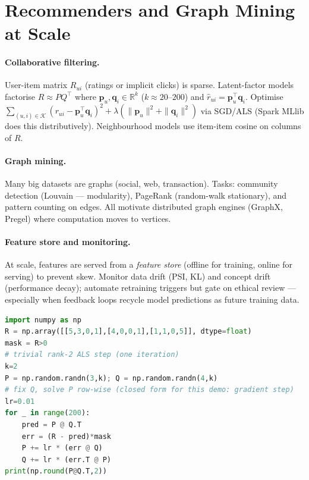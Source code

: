 \section{Recommenders and Graph Mining at Scale}
\label{sec:recommender}
\paragraph{Collaborative filtering.} User-item matrix $R_{ui}$ (ratings or implicit clicks) is sparse. Latent-factor models factorise $R\approx P Q^\top$ where $\mathbf{p}_u,\mathbf{q}_i\in\mathbb{R}^k$ ($k\approx20$--$200$) and $\hat{r}_{ui}=\mathbf{p}_u^\top\mathbf{q}_i$. Optimise $\sum_{(u,i)\in\mathcal{K}}(r_{ui}-\mathbf{p}_u^\top\mathbf{q}_i)^2+\lambda(\|\mathbf{p}_u\|^2+\|\mathbf{q}_i\|^2)$ via SGD/ALS (Spark MLlib does this distributively). Neighbourhood models use item-item cosine on columns of $R$.

\paragraph{Graph mining.} Many big datasets are graphs (social, web, transaction). Tasks: community detection (Louvain --- modularity), PageRank (random-walk stationary), and pattern counting on edges. All motivate distributed graph engines (GraphX, Pregel) where computation moves to vertices.

\paragraph{Feature store and monitoring.} At scale, features are served from a \emph{feature store} (offline for training, online for serving) to prevent skew. Monitor data drift (PSI, KL) and concept drift (performance decay); automate retraining triggers but gate on ethical review --- especially when feedback loops recycle model predictions as future training data.

\begin{lstlisting}[language=Python, caption={ALS-style recommender intuition in pure Python (tiny demo).}, label={lst:als}]
import numpy as np
R = np.array([[5,3,0,1],[4,0,0,1],[1,1,0,5]], dtype=float)
mask = R>0
# trivial rank-2 ALS step (one iteration)
k=2
P = np.random.randn(3,k); Q = np.random.randn(4,k)
# fix Q, solve P row-wise (closed form for this demo: gradient step)
lr=0.01
for _ in range(200):
    pred = P @ Q.T
    err = (R - pred)*mask
    P += lr * (err @ Q)
    Q += lr * (err.T @ P)
print(np.round(P@Q.T,2))
\end{lstlisting}

